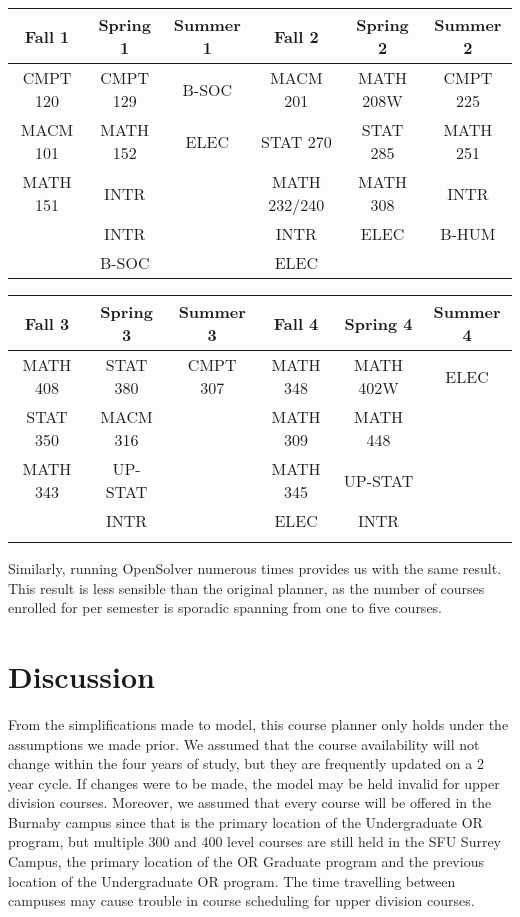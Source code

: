 \documentclass{article}
\begin{document}
\begin{center}
 \begin{tabular}{|c c c c c c|} 
 \hline
 Fall 1 & Spring 1 & Summer 1 & Fall 2 & Spring 2 & Summer 2\\ [0.5ex] 
 \hline\hline
 CMPT 120 & CMPT 129 &B-SOC& MACM 201 & MATH 208W& CMPT 225 \\ 
 \hline
 MACM 101 & MATH 152 &ELEC& STAT 270 & STAT 285& MATH 251\\
 \hline
 MATH 151 & INTR & &MATH 232/240 & MATH 308& INTR\\
 \hline
  & INTR & & INTR &ELEC &B-HUM\\
 \hline
  & B-SOC & & ELEC & &\\ [1ex] 
 \hline
\end{tabular}

 \begin{tabular}{|c c c c c c|} 
 \hline
 Fall 3 & Spring 3 & Summer 3 & Fall 4 & Spring 4 & Summer 4 \\ [0.5ex] 
 \hline\hline
  MATH 408 & STAT 380 & CMPT 307 &MATH 348 & MATH 402W & ELEC\\ 
 \hline
  STAT 350 & MACM 316 & & MATH 309 & MATH 448 &\\
 \hline
  MATH 343 & UP-STAT &  &MATH 345 & UP-STAT &\\
 \hline
   & INTR &  &ELEC & INTR &\\
 \hline
    &  &  & &  & \\ [1ex] 
 \hline
\end{tabular}
\end{center}

\noindent
Similarly, running OpenSolver numerous times provides us with the same result. This result is less sensible than the original planner, as the number of courses enrolled for per semester is sporadic spanning from one to five courses. 
\section {Discussion}

From the simplifications made to model, this course planner only holds under the assumptions we made prior. We assumed that the course availability will not change within the four years of study, but they are frequently updated on a 2 year cycle. If changes were to be made, the model may be held invalid for upper division courses. Moreover, we assumed that every course will be offered in the Burnaby campus since that is the primary location of the Undergraduate OR program, but multiple 300 and 400 level courses are still held in the SFU Surrey Campus, the primary location of the OR Graduate program and the previous location of the Undergraduate OR program. The time travelling between campuses may cause trouble in course scheduling for upper division courses. \\
\end{document}
